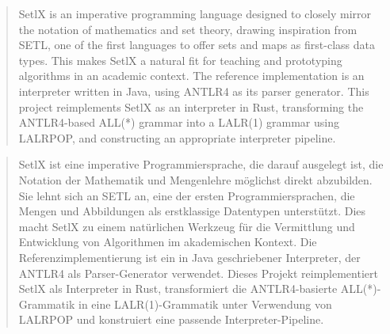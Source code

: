 \begin{abstract}

\renewcommand{\abstractname}{Abstract}

SetlX is an imperative programming language designed to closely mirror the notation of mathematics and set theory, drawing inspiration from SETL, one of the first languages to offer sets and maps as first-class data types. This makes SetlX a natural fit for teaching and prototyping algorithms in an academic context. The reference implementation is an interpreter written in Java, using ANTLR4 as its parser generator. This project reimplements SetlX as an interpreter in Rust, transforming the ANTLR4-based ALL(*) grammar into a LALR(1) grammar using LALRPOP, and constructing an appropriate interpreter pipeline.

\end{abstract}

\begin{abstract}

\renewcommand{\abstractname}{Abstract}

\par
SetlX ist eine imperative Programmiersprache, die darauf ausgelegt ist, die Notation der Mathematik und Mengenlehre möglichst direkt abzubilden. Sie lehnt sich an SETL an, eine der ersten Programmiersprachen, die Mengen und Abbildungen als erstklassige Datentypen unterstützt. Dies macht SetlX zu einem natürlichen Werkzeug für die Vermittlung und Entwicklung von Algorithmen im akademischen Kontext. Die Referenzimplementierung ist ein in Java geschriebener Interpreter, der ANTLR4 als Parser-Generator verwendet. Dieses Projekt reimplementiert SetlX als Interpreter in Rust, transformiert die ANTLR4-basierte ALL(*)-Grammatik in eine LALR(1)-Grammatik unter Verwendung von LALRPOP und konstruiert eine passende Interpreter-Pipeline.

\end{abstract}
